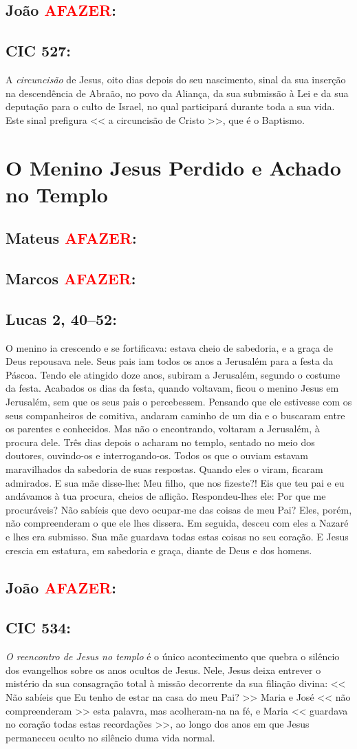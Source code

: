 \documentclass[10pt,a5paper]{book}
\newcommand{\from}[1]{\subsection*{#1}}
\newcommand{\TODO}{\textcolor{red}{\ttfamily AFAZER}}
\begin{document}
\from{João \TODO:}

\from{CIC 527:}

A \emph{circuncisão} de Jesus, oito dias depois do seu nascimento, sinal da sua inserção na descendência de Abraão, no povo da Aliança, da sua submissão à Lei e da sua deputação para o culto de Israel, no qual participará durante toda a sua vida.
Este sinal prefigura << a circuncisão de Cristo >>, que é o Baptismo.


\section{O Menino Jesus Perdido e Achado no Templo}

\from{Mateus \TODO:}

\from{Marcos \TODO:}

\from{Lucas 2, 40--52:}

O menino ia crescendo e se fortificava: estava cheio de sabedoria, e a graça de Deus repousava nele.
Seus pais iam todos os anos a Jerusalém para a festa da Páscoa.
Tendo ele atingido doze anos, subiram a Jerusalém, segundo o costume da festa.
Acabados os dias da festa, quando voltavam, ficou o menino Jesus em Jerusalém, sem que os seus pais o percebessem.
Pensando que ele estivesse com os seus companheiros de comitiva, andaram caminho de um dia e o buscaram entre os parentes e conhecidos.
Mas não o encontrando, voltaram a Jerusalém, à procura dele.
Três dias depois o acharam no templo, sentado no meio dos doutores, ouvindo-os e interrogando-os.
Todos os que o ouviam estavam maravilhados da sabedoria de suas respostas.
Quando eles o viram, ficaram admirados. E sua mãe disse-lhe: Meu filho, que nos fizeste?! Eis que teu pai e eu andávamos à tua procura, cheios de aflição.
Respondeu-lhes ele: Por que me procuráveis? Não sabíeis que devo ocupar-me das coisas de meu Pai?
Eles, porém, não compreenderam o que ele lhes dissera.
Em seguida, desceu com eles a Nazaré e lhes era submisso. Sua mãe guardava todas estas coisas no seu coração.
E Jesus crescia em estatura, em sabedoria e graça, diante de Deus e dos homens.

\from{João \TODO:}

\from{CIC 534:}

\emph{O reencontro de Jesus no templo} é o único acontecimento que quebra o silêncio dos evangelhos sobre os anos ocultos de Jesus.
Nele, Jesus deixa entrever o mistério da sua consagração total à missão decorrente da sua filiação divina:
<< Não sabíeis que Eu tenho de estar na casa do meu Pai? >>
Maria e José << não compreenderam >> esta palavra, mas acolheram-na na fé, e Maria << guardava no coração todas estas recordações >>, ao longo dos anos em que Jesus permaneceu oculto no silêncio duma vida normal.
\end{document}
